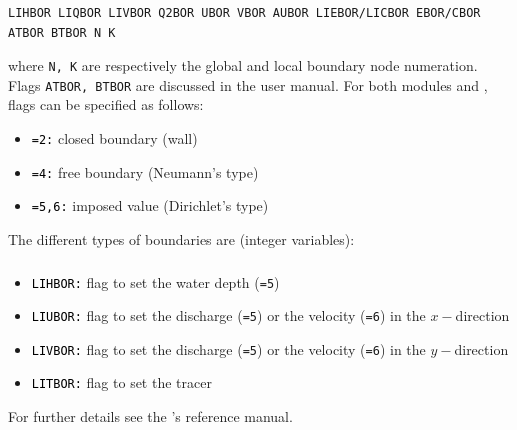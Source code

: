 {\subsubsection{\gaia{}}
\begin{lstlisting}[frame=trBL]
LIHBOR LIQBOR LIVBOR Q2BOR UBOR VBOR AUBOR LIEBOR/LICBOR EBOR/CBOR ATBOR BTBOR N K
\end{lstlisting}
where \texttt{N, K} are respectively the global and local boundary node numeration. Flags \texttt{ATBOR, BTBOR} are discussed in the  user manual. For both modules  and \gaia{}, flags can be specified as follows:
\begin{itemize}
\item \texttt{\textcolor{black}{=2:}} closed boundary (wall)
\item \texttt{\textcolor{black}{=4:}} free boundary (Neumann's type)
\item \texttt{\textcolor{black}{=5,6:}} imposed value (Dirichlet's type)
\end{itemize}

The different types of boundaries are (integer variables):
\subsubsection{}
\begin{itemize}
\item \texttt{\textcolor{black}{LIHBOR:}} flag to set the water depth (\texttt{=5})
\item \texttt{\textcolor{black}{LIUBOR:}} flag to set the discharge (\texttt{=5}) or the velocity (\texttt{=6}) in the $x-$direction
\item \texttt{\textcolor{black}{LIVBOR:}} flag to set the discharge (\texttt{=5}) or the velocity (\texttt{=6}) in the $y-$direction
\item \texttt{\textcolor{black}{LITBOR:}} flag to set the tracer
\end{itemize}
For further details see the 's reference manual.
}
